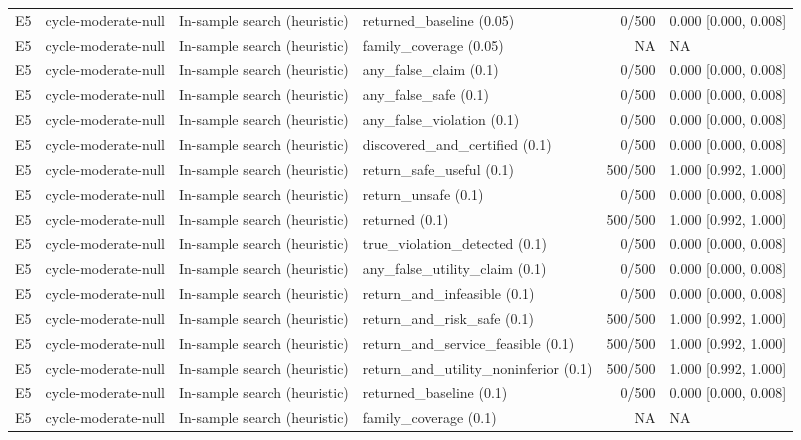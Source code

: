\begin{longtable}{p{.04\linewidth}p{.18\linewidth}p{.19\linewidth}p{.16\linewidth}r p{.21\linewidth}}
E5 & cycle-moderate-null & In-sample search (heuristic) & returned\_baseline (0.05) & 0/500 & 0.000 [0.000, 0.008]\\
E5 & cycle-moderate-null & In-sample search (heuristic) & family\_coverage (0.05) & NA & NA\\
E5 & cycle-moderate-null & In-sample search (heuristic) & any\_false\_claim (0.1) & 0/500 & 0.000 [0.000, 0.008]\\
E5 & cycle-moderate-null & In-sample search (heuristic) & any\_false\_safe (0.1) & 0/500 & 0.000 [0.000, 0.008]\\
E5 & cycle-moderate-null & In-sample search (heuristic) & any\_false\_violation (0.1) & 0/500 & 0.000 [0.000, 0.008]\\
E5 & cycle-moderate-null & In-sample search (heuristic) & discovered\_and\_certified (0.1) & 0/500 & 0.000 [0.000, 0.008]\\
E5 & cycle-moderate-null & In-sample search (heuristic) & return\_safe\_useful (0.1) & 500/500 & 1.000 [0.992, 1.000]\\
E5 & cycle-moderate-null & In-sample search (heuristic) & return\_unsafe (0.1) & 0/500 & 0.000 [0.000, 0.008]\\
E5 & cycle-moderate-null & In-sample search (heuristic) & returned (0.1) & 500/500 & 1.000 [0.992, 1.000]\\
E5 & cycle-moderate-null & In-sample search (heuristic) & true\_violation\_detected (0.1) & 0/500 & 0.000 [0.000, 0.008]\\
E5 & cycle-moderate-null & In-sample search (heuristic) & any\_false\_utility\_claim (0.1) & 0/500 & 0.000 [0.000, 0.008]\\
E5 & cycle-moderate-null & In-sample search (heuristic) & return\_and\_infeasible (0.1) & 0/500 & 0.000 [0.000, 0.008]\\
E5 & cycle-moderate-null & In-sample search (heuristic) & return\_and\_risk\_safe (0.1) & 500/500 & 1.000 [0.992, 1.000]\\
E5 & cycle-moderate-null & In-sample search (heuristic) & return\_and\_service\_feasible (0.1) & 500/500 & 1.000 [0.992, 1.000]\\
E5 & cycle-moderate-null & In-sample search (heuristic) & return\_and\_utility\_noninferior (0.1) & 500/500 & 1.000 [0.992, 1.000]\\
E5 & cycle-moderate-null & In-sample search (heuristic) & returned\_baseline (0.1) & 0/500 & 0.000 [0.000, 0.008]\\
E5 & cycle-moderate-null & In-sample search (heuristic) & family\_coverage (0.1) & NA & NA\\

\end{longtable}

